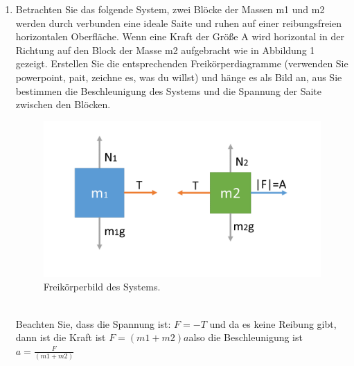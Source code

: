 \documentclass[letterpaper,12pt]{article}
\begin{document}
\begin{enumerate}
    \item Betrachten Sie das folgende System, zwei Blöcke der Massen m1 und m2 werden durch verbunden eine ideale Saite und ruhen auf einer reibungsfreien horizontalen Oberfläche. Wenn eine Kraft der Größe A wird horizontal in der Richtung auf den Block der Masse m2 aufgebracht wie in Abbildung 1 gezeigt. Erstellen Sie die entsprechenden Freikörperdiagramme (verwenden Sie powerpoint, pait, zeichne es, was du willst) und hänge es als Bild an, aus Sie bestimmen die Beschleunigung des Systems und die Spannung der Saite zwischen den Blöcken.
     \begin{figure}[h]
        \caption{Freikörperbild des Systems.}
        \includegraphics[scale=0.5]{Bildern/diagrama de cuerpo libre.png}
    \end{figure}\\
    Beachten Sie, dass die Spannung ist: $F=-T$\hspace{0.5cm} und da es keine Reibung gibt, dann ist die Kraft ist $F=(m1+m2)a$\hspace{0.2cm}also die Beschleunigung ist\hspace{0.2cm}$a=\frac{F}{(m1+m2)}$
\end{enumerate}
\end{document}
